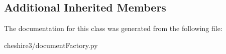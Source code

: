 \subsection*{Additional Inherited Members}


The documentation for this class was generated from the following file\-:\begin{DoxyCompactItemize}
\item 
cheshire3/document\-Factory.\-py\end{DoxyCompactItemize}
